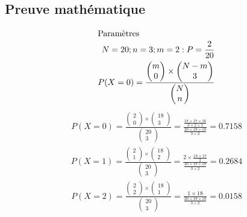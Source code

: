 \documentclass{article}
\begin{document}
\subsection{Preuve mathématique}
\begin{align}
\intertext{Paramètres}
N=20 ; n=3 ; m = 2 : P = \frac{2}{20}
\\
P(X=0)=\frac{
\begin{pmatrix}
m \\ 0
\end{pmatrix}
\times 
\begin{pmatrix}
N - m \\ 3
\end{pmatrix}
}{
\begin{pmatrix}
N \\ n
\end{pmatrix}
} 
\end{align}
\begin{align}
P(X=0)=\frac{
\begin{pmatrix}
2 \\ 0
\end{pmatrix}
\times 
\begin{pmatrix}
18 \\ 3
\end{pmatrix}
}{
\begin{pmatrix}
20 \\ 3
\end{pmatrix}
}= \frac{\frac{18\times17\times16}{3\times2\times1}}{\frac{20\times19\times18}{3 \times 2}} = 0.7158
\end{align} 
\begin{align}
P(X=1)=\frac{
\begin{pmatrix}
2 \\ 1
\end{pmatrix}
\times 
\begin{pmatrix}
18 \\ 2
\end{pmatrix}
}{
\begin{pmatrix}
20 \\ 3
\end{pmatrix}
}= \frac{2 \times \frac{18\times17}{2}}{\frac{20\times19\times18}{3 \times 2}} = 0.2684
\end{align}
\begin{align}
P(X=2)=\frac{
\begin{pmatrix}
2 \\ 2
\end{pmatrix}
\times 
\begin{pmatrix}
18 \\ 1
\end{pmatrix}
}{
\begin{pmatrix}
20 \\ 3
\end{pmatrix}
}= \frac{1 \times 18}{\frac{20\times19\times18}{3 \times 2}} = 0.0158
\end{align}
\end{document}
